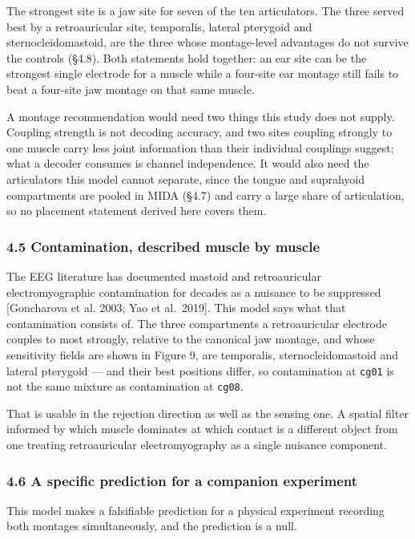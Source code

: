 \documentclass[
  11pt,
  letterpaper,
]{article}
\begin{document}
The strongest site is a jaw site for seven of the ten articulators. The three
served best by a retroauricular site, temporalis, lateral pterygoid and
sternocleidomastoid, are the three whose montage-level advantages do not survive
the controls (§4.8). Both statements hold together: an ear site can be the
strongest single electrode for a muscle while a four-site ear montage still
fails to beat a four-site jaw montage on that same muscle.

A montage recommendation would need two things this study does not supply.
Coupling strength is not decoding accuracy, and two sites coupling strongly to
one muscle carry less joint information than their individual couplings suggest;
what a decoder consumes is channel independence. It would also need the
articulators this model cannot separate, since the tongue and suprahyoid
compartments are pooled in MIDA (§4.7) and carry a large share of articulation,
so no placement statement derived here covers them.

\subsubsection{4.5 Contamination, described muscle by muscle}\label{contamination-described-muscle-by-muscle}

The EEG literature has documented mastoid and retroauricular electromyographic
contamination for decades as a nuisance to be suppressed {[}Goncharova et al.
2003; Yao et al.~2019{]}. This model says what that contamination consists of. The
three compartments a retroauricular electrode couples to most strongly, relative
to the canonical jaw montage, and whose sensitivity fields are shown in Figure 9,
are temporalis, sternocleidomastoid and lateral
pterygoid --- and their best positions differ, so contamination at \texttt{cg01} is not
the same mixture as contamination at \texttt{cg08}.

That is usable in the rejection direction as well as the sensing one. A spatial
filter informed by which muscle dominates at which contact is a different object
from one treating retroauricular electromyography as a single nuisance
component.

\subsubsection{4.6 A specific prediction for a companion experiment}\label{a-specific-prediction-for-a-companion-experiment}

This model makes a falsifiable prediction for a physical experiment recording
both montages simultaneously, and the prediction is a null.
\end{document}
